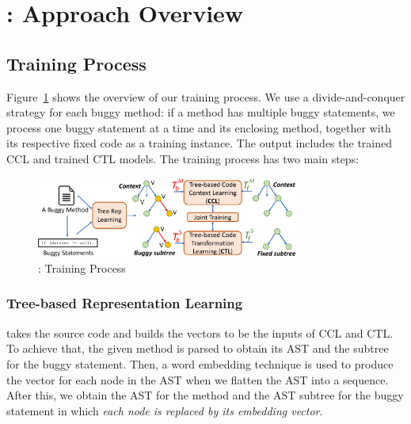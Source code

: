 \section{{\tool}: Approach Overview}
\label{overview:sec}



\subsection{Training Process}

Figure~\ref{overview-training} shows the overview of our training
process. We use a divide-and-conquer strategy for each buggy method:
if a method has multiple buggy statements, we process one buggy
statement at a time and its enclosing method, together with its
respective fixed code as a training instance.
The output includes the trained CCL and trained CTL models.
The training process has two main steps:

\begin{figure}[t]
	\centering
	\includegraphics[width=3.4in]{graphs/new_overview-4.png}
	\caption{{\tool}: Training Process}
	\label{overview-training}
\end{figure}


\subsubsection{Tree-based Representation Learning}

{\tool} takes the source code and builds the vectors to be the inputs
of CCL and CTL. To achieve that, the given method is parsed to obtain
its AST and the subtree for the buggy statement.  Then, a word
embedding technique is used to produce the vector for each node in the
AST when we flatten the AST into a sequence. After this, we obtain the
AST for the method and the AST subtree for the buggy statement in
which {\em each node is replaced by its embedding vector}.


